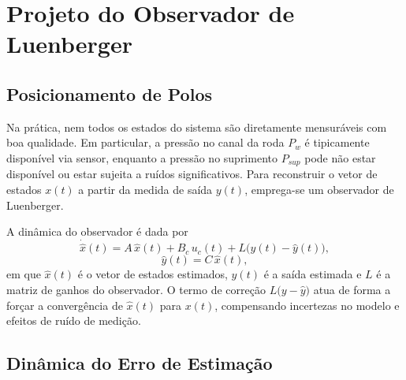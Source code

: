 \section{Projeto do Observador de Luenberger}
\label{sec:projeto-observador-luenberger}

\subsection{Posicionamento de Polos}
\label{sec:posicionamento-polos}

Na prática, nem todos os estados do sistema são diretamente mensuráveis com boa qualidade. Em particular, a pressão no canal da roda $P_w$ é tipicamente disponível via sensor, enquanto a pressão no suprimento $P_{sup}$ pode não estar disponível ou estar sujeita a ruídos significativos. Para reconstruir o vetor de estados $x(t)$ a partir da medida de saída $y(t)$, emprega-se um observador de Luenberger.

A dinâmica do observador é dada por
\[
    \dot{\hat{x}}(t) = A\,\hat{x}(t) + B_c\,u_c(t)
                       + L\big(y(t) - \hat{y}(t)\big),
\]
\[
    \hat{y}(t) = C\,\hat{x}(t),
\]
em que $\hat{x}(t)$ é o vetor de estados estimados, $\hat{y}(t)$ é a saída estimada e $L$ é a matriz de ganhos do observador. O termo de correção $L\big(y - \hat{y}\big)$ atua de forma a forçar a convergência de $\hat{x}(t)$ para $x(t)$, compensando incertezas no modelo e efeitos de ruído de medição.

\subsection{Dinâmica do Erro de Estimação}
\label{sec:dinamica-erro-estimacao}

